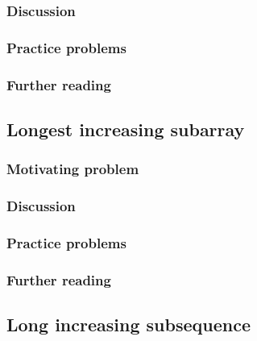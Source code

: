 



\subsubsection*{Discussion}

\subsubsection*{Practice problems}

\subsubsection*{Further reading}

\subsection{Longest increasing subarray}

\subsubsection*{Motivating problem}







\subsubsection*{Discussion}

\subsubsection*{Practice problems}

\subsubsection*{Further reading}

\subsection{Long increasing subsequence}

